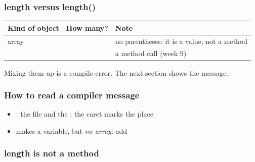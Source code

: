\documentclass[aspectratio=169,10pt,compress]{beamer}
\begin{document}
\begin{frame}[t,fragile] \frametitle{length versus length()}


\begin{table}
		\small
		\begin{tabular}{@{}L{0.22\textwidth}L{0.22\textwidth}L{0.46\textwidth}@{}}
			\toprule
			\textbf{Kind of object} & \textbf{How many?} & \textbf{Note} \\
			\midrule
			array                  &       & no parentheses: it is a value, not a method \\
			         &     & a method call (week 9) \\
			\bottomrule
		\end{tabular}
\end{table}%


	\vspace{0.5em}
	\small Mixing them up is a compile error. The next section shows the message.
\end{frame}








\begin{frame}[t,fragile] \frametitle{How to read a compiler message}

	\begin{itemize}\small
		\item<2-> : the file and the ; the caret \hCode{\^{}} marks the place
		\item<2->  makes a variable, but \emph{no array}: add 
	\end{itemize}
\end{frame}




\begin{frame}[t,fragile] \frametitle{length is not a method}

	\small {}
\end{frame}
\end{document}
